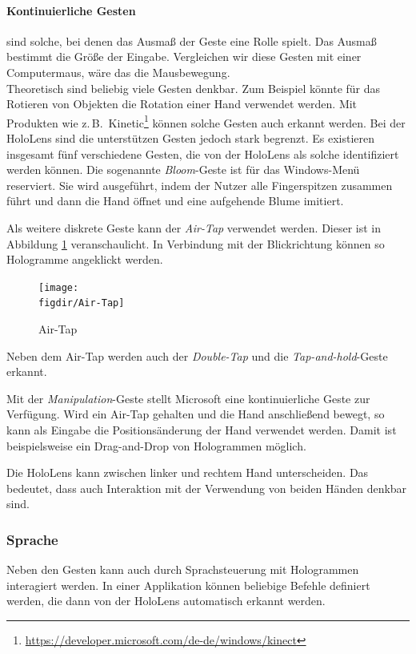 \paragraph{Kontinuierliche Gesten} sind solche, bei denen das Ausmaß der Geste eine Rolle spielt. Das Ausmaß bestimmt die Größe der Eingabe. Vergleichen wir diese Gesten mit einer Computermaus, wäre das die Mausbewegung.\\

Theoretisch sind beliebig viele Gesten denkbar. Zum Beispiel könnte für das Rotieren von Objekten die Rotation einer Hand verwendet werden. Mit Produkten wie z.\,B.\ Kinetic\footnote{\url{https://developer.microsoft.com/de-de/windows/kinect}} können solche Gesten auch erkannt werden. Bei der HoloLens sind die unterstützen Gesten jedoch stark begrenzt. Es existieren insgesamt fünf verschiedene Gesten, die von der HoloLens als solche identifiziert werden können. Die sogenannte \textit{Bloom}-Geste ist für das Windows-Menü reserviert. Sie wird ausgeführt, indem der Nutzer alle Fingerspitzen zusammen führt und dann die Hand öffnet und eine aufgehende Blume imitiert.

Als weitere diskrete Geste kann der \textit{Air-Tap} verwendet werden. Dieser ist in Abbildung \ref{fig:Air-Tap} veranschaulicht. In Verbindung mit der Blickrichtung können so Hologramme angeklickt werden.

\begin{figure}[htb]
  \texttt{[image: \\figdir/Air-Tap]}
  \caption{Air-Tap \cite{windows2017gesture}}
  \label{fig:Air-Tap}
\end{figure}

Neben dem Air-Tap werden auch der \textit{Double-Tap} und die \textit{Tap-and-hold}-Geste erkannt.

Mit der \textit{Manipulation}-Geste stellt Microsoft eine kontinuierliche Geste zur Verfügung. Wird ein Air-Tap gehalten und die Hand anschließend bewegt, so kann als Eingabe die Positionsänderung der Hand verwendet werden. Damit ist beispielsweise ein Drag-and-Drop von Hologrammen möglich.

Die HoloLens kann zwischen linker und rechtem Hand unterscheiden. Das bedeutet, dass auch Interaktion mit der Verwendung von beiden Händen denkbar sind.

\subsubsection*{Sprache}
Neben den Gesten kann auch durch Sprachsteuerung mit Hologrammen interagiert werden. In einer Applikation können beliebige Befehle definiert werden, die dann von der HoloLens automatisch erkannt werden.

